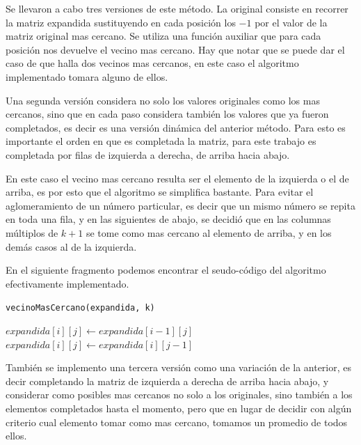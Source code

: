 \documentclass[a4paper]{article}
\newcounter{row}
\newcounter{col}
\begin{document}
Se llevaron a cabo tres versiones de este método. La original consiste en recorrer la matriz expandida sustituyendo en cada posición los $ -1 $ por el valor de la matriz original mas cercano. Se utiliza una función auxiliar que para cada posición nos devuelve el vecino mas cercano. Hay que notar que se puede dar el caso de que halla dos vecinos mas cercanos, en este caso el algoritmo implementado tomara alguno de ellos.

Una segunda versión considera no solo los valores originales como los mas cercanos, sino que en cada paso considera también los valores que ya fueron completados, es decir es una versión dinámica del anterior método. Para esto es importante el orden en que es completada la matriz, para este trabajo es completada por filas de izquierda a derecha, de arriba hacia abajo.
 
 En este caso el vecino mas cercano resulta ser el elemento de la izquierda o el de arriba, es por esto que el algoritmo se simplifica bastante. Para evitar el aglomeramiento de un número particular, es decir que un mismo número se repita en toda una fila, y en las siguientes de abajo, se decidió que en las columnas múltiplos de $ k +1 $ se tome como mas cercano al elemento de arriba, y en los demás casos al de la izquierda.
 
 
 En el siguiente fragmento podemos encontrar el seudo-código del algoritmo efectivamente implementado.


\begin{algorithm}[H]
    \caption{\texttt{vecinoMasCercano(expandida, k)}}
\begin{algorithmic}[1]
  \For{$i \leftarrow [0:cantidad\_filas) $}
    \For{$j \leftarrow [0:cantidad\_columnas)$}
        		\State $expandida[i][j] \leftarrow expandida[i-1][j]$
          \Else
            \State $expandida[i][j] \leftarrow expandida[i][j-1]$
          \EndIf
       \EndIf
    \EndFor
  \EndFor
\end{algorithmic}
\end{algorithm}

También se implemento una tercera versión como una variación de la anterior, es decir completando la matriz de izquierda a derecha de arriba hacia abajo, y considerar como posibles mas cercanos no solo a los originales, sino también a los elementos completados hasta el momento, pero que en lugar de decidir con algún criterio cual elemento tomar como mas cercano, tomamos un promedio de todos ellos.
\end{document}
